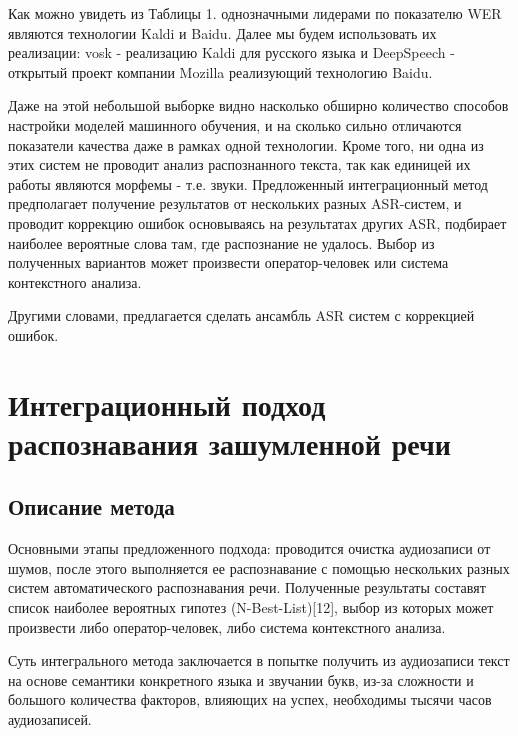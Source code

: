 \documentclass[conference]{IEEEtran}
\begin{document}
Как можно увидеть из Таблицы 1. однозначными лидерами по показателю WER являются технологии Kaldi и Baidu. Далее мы будем использовать их реализации: vosk - реализацию Kaldi для русского языка и DeepSpeech - открытый проект компании Mozilla реализующий технологию Baidu.

Даже на этой небольшой выборке видно насколько обширно количество способов настройки моделей машинного обучения, и на сколько сильно отличаются показатели качества даже в рамках одной технологии. Кроме того, ни одна из этих систем не проводит анализ распознанного текста, так как единицей их работы являются морфемы - т.е. звуки. Предложенный интеграционный метод предполагает получение результатов от нескольких разных ASR-систем, и проводит коррекцию ошибок основываясь на результатах других ASR, подбирает наиболее вероятные слова там, где распознание не удалось. Выбор из полученных вариантов может произвести оператор-человек или система контекстного анализа.

Другими словами, предлагается сделать ансамбль ASR систем с коррекцией ошибок.

\section{Интеграционный подход распознавания зашумленной речи}
\subsection{Описание метода}
Основными этапы предложенного подхода: проводится очистка аудиозаписи от шумов, после этого выполняется ее распознавание с помощью нескольких разных систем автоматического распознавания речи. Полученные результаты составят список наиболее вероятных гипотез (N-Best-List)[12], выбор из которых может произвести либо оператор-человек, либо система контекстного анализа.

Суть интегрального метода заключается в попытке получить из аудиозаписи текст на основе семантики конкретного языка и звучании букв, из-за сложности и большого количества факторов, влияющих на успех, необходимы тысячи часов аудиозаписей.
\end{document}
